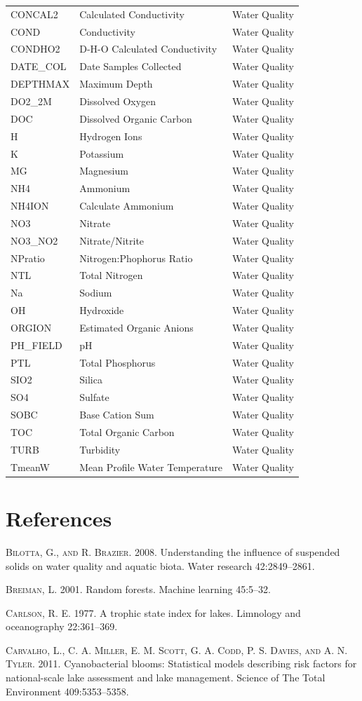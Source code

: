 \documentclass[11pt,]{article}
\begin{document}
\begin{longtable}[c]{@{}lll@{}}
CONCAL2 & Calculated Conductivity & Water Quality\tabularnewline
COND & Conductivity & Water Quality\tabularnewline
CONDHO2 & D-H-O Calculated Conductivity & Water Quality\tabularnewline
DATE\_COL & Date Samples Collected & Water Quality\tabularnewline
DEPTHMAX & Maximum Depth & Water Quality\tabularnewline
DO2\_2M & Dissolved Oxygen & Water Quality\tabularnewline
DOC & Dissolved Organic Carbon & Water Quality\tabularnewline
H & Hydrogen Ions & Water Quality\tabularnewline
K & Potassium & Water Quality\tabularnewline
MG & Magnesium & Water Quality\tabularnewline
NH4 & Ammonium & Water Quality\tabularnewline
NH4ION & Calculate Ammonium & Water Quality\tabularnewline
NO3 & Nitrate & Water Quality\tabularnewline
NO3\_NO2 & Nitrate/Nitrite & Water Quality\tabularnewline
NPratio & Nitrogen:Phophorus Ratio & Water Quality\tabularnewline
NTL & Total Nitrogen & Water Quality\tabularnewline
Na & Sodium & Water Quality\tabularnewline
OH & Hydroxide & Water Quality\tabularnewline
ORGION & Estimated Organic Anions & Water Quality\tabularnewline
PH\_FIELD & pH & Water Quality\tabularnewline
PTL & Total Phosphorus & Water Quality\tabularnewline
SIO2 & Silica & Water Quality\tabularnewline
SO4 & Sulfate & Water Quality\tabularnewline
SOBC & Base Cation Sum & Water Quality\tabularnewline
TOC & Total Organic Carbon & Water Quality\tabularnewline
TURB & Turbidity & Water Quality\tabularnewline
TmeanW & Mean Profile Water Temperature & Water Quality\tabularnewline
\bottomrule
\end{longtable}

\newpage

\section*{References}\label{references}

\textsc{Bilotta, G., and R. Brazier}. 2008. Understanding the influence
of suspended solids on water quality and aquatic biota. Water research
42:2849--2861.

\textsc{Breiman, L.} 2001. Random forests. Machine learning 45:5--32.

\textsc{Carlson, R. E.} 1977. A trophic state index for lakes. Limnology
and oceanography 22:361--369.

\textsc{Carvalho, L., C. A. Miller, E. M. Scott, G. A. Codd, P. S.
Davies, and A. N. Tyler}. 2011. Cyanobacterial blooms: Statistical
models describing risk factors for national-scale lake assessment and
lake management. Science of The Total Environment 409:5353--5358.
\end{document}
